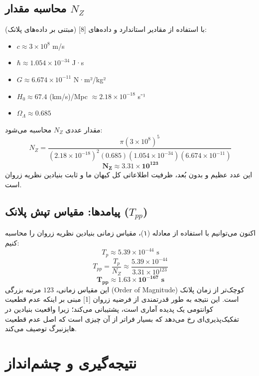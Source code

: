 \documentclass[11pt, a4paper, twocolumn]{article} %
\begin{document}
\subsection{محاسبه مقدار $N_Z$}
با استفاده از مقادیر استاندارد و داده‌های [8] (مبتنی بر داده‌های پلانک):
\begin{itemize}
    \item $c \approx 3 \times 10^8$ m/s
    \item $\hbar \approx 1.054 \times 10^{-34}$ J·s
    \item $G \approx 6.674 \times 10^{-11}$ N·m²/kg²
    \item $H_0 \approx 67.4$ (km/s)/Mpc $\approx 2.18 \times 10^{-18}$ s⁻¹
    \item $\Omega_\Lambda \approx 0.685$
\end{itemize}
مقدار عددی $N_Z$ محاسبه می‌شود:
\begin{equation*}
N_Z = \frac{\pi (3 \times 10^8)^5}{ (2.18 \times 10^{-18})^2 (0.685) (1.054 \times 10^{-34}) (6.674 \times 10^{-11}) }
\end{equation*}
\begin{equation}
\mathbf{N_Z \approx 3.31 \times 10^{123}}
\end{equation}
این عدد عظیم و بدون بُعد، ظرفیت اطلاعاتی کل کیهان ما و ثابت بنیادین نظریه زروان است.

\subsection{پیامدها: مقیاس تپش پلانک ($T_{pp}$)}
اکنون می‌توانیم با استفاده از معادله (۱)، مقیاس زمانی بنیادین نظریه زروان را محاسبه کنیم:
\begin{equation*}
T_p \approx 5.39 \times 10^{-44} \text{ s}
\end{equation*}
\begin{equation*}
T_{pp} = \frac{T_p}{N_Z} \approx \frac{5.39 \times 10^{-44}}{3.31 \times 10^{123}}
\end{equation*}
\begin{equation}
\mathbf{T_{pp} \approx 1.63 \times 10^{-167} \text{ s}}
\end{equation}
این مقیاس زمانی، $123$ مرتبه بزرگی (Order of Magnitude) کوچک‌تر از زمان پلانک است. این نتیجه به طور قدرتمندی از فرضیه زروان [1] مبنی بر اینکه عدم قطعیت کوانتومی یک پدیده آماری است، پشتیبانی می‌کند؛ زیرا واقعیت بنیادین در تفکیک‌پذیری‌ای رخ می‌دهد که بسیار فراتر از آن چیزی است که اصل عدم قطعیت هایزنبرگ توصیف می‌کند.

\section{نتیجه‌گیری و چشم‌انداز}
\end{document}
